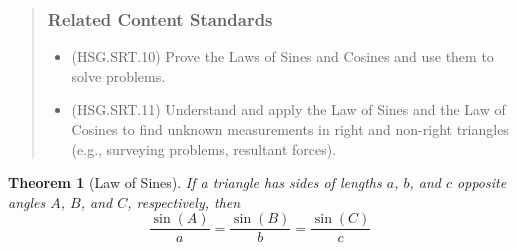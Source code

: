 \documentclass[
]{book}
\providecommand{\tightlist}{%
  \setlength{\itemsep}{0pt}\setlength{\parskip}{0pt}}
\newtheorem{theorem}{Theorem}[chapter]
\theoremstyle{definition}
\theoremstyle{definition}
\theoremstyle{definition}
\theoremstyle{remark}
\begin{document}
\begin{quote}
\hypertarget{related-content-standards-59}{%
\subsubsection*{Related Content Standards}\label{related-content-standards-59}}

\begin{itemize}
\tightlist
\item
  (HSG.SRT.10) Prove the Laws of Sines and Cosines and use them to solve problems.
\item
  (HSG.SRT.11) Understand and apply the Law of Sines and the Law of Cosines to find unknown measurements in right and non-right triangles (e.g., surveying problems, resultant forces).
\end{itemize}
\end{quote}

\begin{theorem}[Law of Sines]
\protect\hypertarget{thm:unnamed-chunk-237}{}{\label{thm:unnamed-chunk-237} {} }If a triangle has sides of lengths \(a\), \(b\), and \(c\) opposite angles \(A\), \(B\), and \(C\), respectively, then
\[\frac{\sin(A)}{a}=\frac{\sin(B)}{b} = \frac{\sin(C)}{c}\]
\end{theorem}
\end{document}
